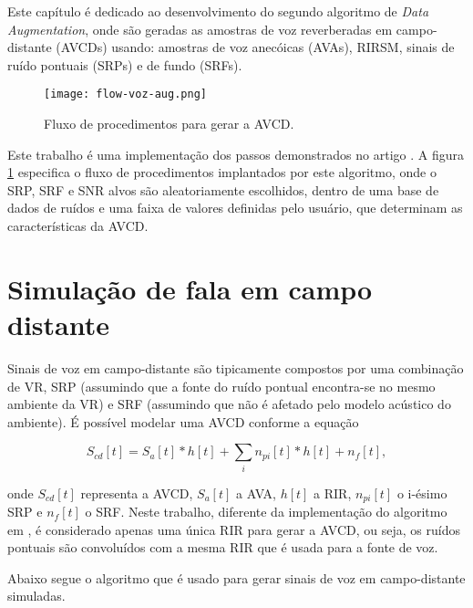 Este capítulo é dedicado ao desenvolvimento do segundo algoritmo de \textit{Data Augmentation}, onde são geradas as amostras de voz 
reverberadas em campo-distante (AVCDs) usando: amostras de voz anecóicas (AVAs), RIRSM, sinais de ruído pontuais (SRPs) e de fundo (SRFs).

\begin{figure} [H]
    \centering
    \texttt{[image: flow-voz-aug.png]}
    \caption{Fluxo de procedimentos para gerar a AVCD.} 
    \label{fig:flow-voz-rev}
\end{figure}

Este trabalho é uma implementação dos passos demonstrados no artigo \cite{Speech_Rec}. A figura \ref{fig:flow-voz-rev} especifica 
o fluxo de procedimentos implantados por este algoritmo, onde o SRP, SRF e SNR alvos são aleatoriamente escolhidos, 
dentro de uma base de dados de ruídos e uma faixa de valores definidas pelo usuário, que determinam as características da AVCD. 

\section{Simulação de fala em campo distante} 

Sinais de voz em campo-distante são tipicamente compostos por uma combinação de VR, SRP (assumindo que a fonte do ruído pontual encontra-se 
no mesmo ambiente da VR) e SRF (assumindo que não é afetado pelo modelo acústico do ambiente).
É possível modelar uma AVCD conforme a equação

\begin{equation} \label{eqn:AVCD-model}
    S_{cd}[t] = S_a[t] \ast h[t] + \sum_i n_{pi}[t] \ast h[t] + n_f[t]
    ,
\end{equation}

onde $S_{cd}[t]$ representa a AVCD, $S_a[t]$ a AVA, $h[t]$ a RIR, $n_{pi}[t]$ o i-ésimo SRP e $n_f[t]$ o SRF.
Neste trabalho, diferente da implementação do algoritmo em \cite{Speech_Rec}, é considerado apenas uma única RIR
para gerar a AVCD, ou seja, os ruídos pontuais são convoluídos com a mesma RIR que é usada para a fonte de voz.


Abaixo segue o algoritmo que é usado para gerar sinais de voz em campo-distante simuladas. 
\bigbreak
\bigbreak

